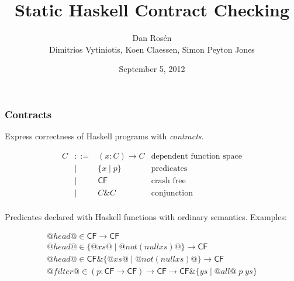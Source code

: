 \documentclass[serif,professionalfont]{beamer}
\title{ {\huge Static Haskell Contract Checking} }
\institute{ Microsoft Research }
\author{ {\Large Dan Ros\'en}
     \vspace{\baselineskip} \\
     Dimitrios Vytiniotis, Koen Claessen, Simon Peyton Jones}
\date{September 5, 2012}
\begin{document}
\maketitle
\makeatactive

\newcommand{\Th}[0]{{\cal T}}
\newcommand{\alttr}[1]{#1^{m}}
\newcommand{\ol}[1]{\overline{#1}}
\newcommand{\Ct}{{\tt C}}
\newcommand{\CF}{{\tt CF}}
\newcommand{\roll}[1]{#1}
\newcommand{\unroll}[1]{#1}
\newcommand{\bind}[2]{#1(#2)}
\newcommand{\ret}[1]{#1}
\newcommand{\injK}[2]{\mathsf{#1}(#2)}
\newcommand{\injKZ}[1]{\mathsf{#1}}
\newcommand{\injFun}[1]{\mathsf{Fun}(#1)}
\newcommand{\injBad}{\mathsf{Bad}}
\newcommand{\dbrace}[1]{[\![#1]\!]}
\newcommand{\Fcf}{F_{\lcfZ}}
\newcommand{\lcfZ}{\textsf{cf}}
\newcommand{\dapp}{\mathsf{app}}
\newcommand\cf[0]{\mathsf{CF}}
\newcommand\conj[0]{\&}
\newcommand\cons[2]{\mathsf{cons}(#1,#2)}
\newcommand\conspi[1]{\mathsf{cons_0}(#1)}
\newcommand\conspii[1]{\mathsf{cons_1}(#1)}
\newcommand\nil[0]{\mathsf{nil}}
\newcommand\head[1]{\mathsf{head}(#1)}
\newcommand\maps[0]{\mathsf{map}}
\newcommand\map[2]{\maps(#1,#2)}
\newcommand\ptr[1]{#1_\mathsf{ptr}}
\newcommand\app[2]{\mathsf{ap}(#1,#2)}
\newcommand\appp[3]{\app{\app{#1}{#2}}{#3}}
\newcommand\unr[0]{@UNR@}
\newcommand\True[0]{@True@}
\newcommand\False[0]{@False@}
\newcommand\bad[0]{@BAD@}
\newcommand\formula[1]{#1}
\newcommand\highlight[1]{#1}
\newcommand{\taus}{\ol{\tau}}
\newcommand{\interp}[3]{[\![#1]\!]} %
\newcommand{\etrans}[3]{{\cal E}\{\!\!\{#3\}\!\!\}}
\newcommand{\ptrans}[2]{{\cal P}\{\!\!\{#2\}\!\!\}}
\newcommand{\trc}[1]{{\cal C}\{\!\!\{#1\}\!\!\}}
\newcommand\Min[0]{\mathsf{min}}


\begin{frame}[fragile]
  \frametitle{Contracts}

  Express correctness of Haskell programs with \emph{contracts}.

  \[\begin{array}{lcll}
    C & ::=  & (x : C) \to C  & \text{dependent function space} \\
      & \mid & \{ x \mid p \} & \text{predicates} \\
      & \mid & \cf            & \text{crash free} \\
      & \mid & C \conj C      & \text{conjunction} \\
  \end{array}\]

  Predicates declared with Haskell functions with ordinary semantics. Examples:

  \[\begin{array}{l}
    @head@ \in \cf \to \cf \\
    @head@ \in \{ @xs@ \mid @not (null xs)@ \} \to \cf \\
    @head@ \in \cf \conj \{ @xs@ \mid @not (null xs)@ \} \to \cf \\
    @filter@ \in (p : \cf \to \cf) \to \cf
                \to \cf \conj \{ ys \mid @all@ \; p \; ys \}
  \end{array}\]

\end{frame}
\end{document}
